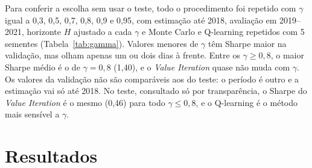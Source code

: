 \documentclass[conference]{IEEEtran}
\begin{document}
Para conferir a escolha sem usar o teste, todo o procedimento foi repetido com $\gamma$ igual a 0,3, 0,5, 0,7, 0,8, 0,9 e 0,95, com estimação até 2018, avaliação em 2019--2021, horizonte $H$ ajustado a cada $\gamma$ e Monte Carlo e Q-learning repetidos com 5 sementes (Tabela~\ref{tab:gamma}). Valores menores de $\gamma$ têm Sharpe maior na validação, mas olham apenas um ou dois dias à frente. Entre os $\gamma \ge 0{,}8$, o maior Sharpe médio é o de $\gamma = 0{,}8$ (1,40), e o \textit{Value Iteration} quase não muda com $\gamma$. Os valores da validação não são comparáveis aos do teste: o período é outro e a estimação vai só até 2018. No teste, consultado só por transparência, o Sharpe do \textit{Value Iteration} é o mesmo (0,46) para todo $\gamma \le 0{,}8$, e o Q-learning é o método mais sensível a $\gamma$.

\section{Resultados}
\label{sec:resultados}
\end{document}
